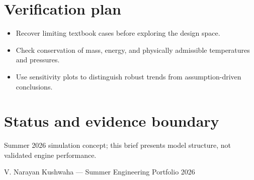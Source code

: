 \documentclass[10pt]{article}
\begin{document}
\section*{Verification plan}
\begin{itemize}
\item Recover limiting textbook cases before exploring the design space.
\item Check conservation of mass, energy, and physically admissible temperatures and pressures.
\item Use sensitivity plots to distinguish robust trends from assumption-driven conclusions.
\end{itemize}

\section*{Status and evidence boundary}
Summer 2026 simulation concept; this brief presents model structure, not validated engine performance.

\vfill
\small\color{muted} V. Narayan Kushwaha --- Summer Engineering Portfolio 2026
\end{document}
